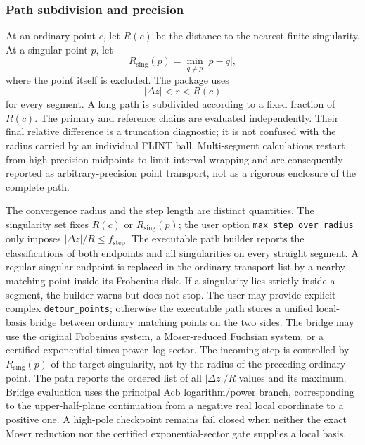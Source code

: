 \documentclass[11pt]{article}
\begin{document}
\subsubsection{Path subdivision and precision}
\label{subsec:path}

At an ordinary point $c$, let $R(c)$ be the distance to the nearest finite singularity.  At
a singular point $p$, let
\begin{equation}
 R_{\mathrm{sing}}(p)=\min_{q\ne p}|p-q|,
\end{equation}
where the point itself is excluded.  The package uses
\begin{equation}
  |\Delta z|<r< R(c)
\end{equation}
for every segment.  A long path is subdivided according to a fixed fraction of $R(c)$.  The
primary and reference chains are evaluated independently.  Their final relative difference
is a truncation diagnostic; it is not confused with the radius carried by an individual
FLINT ball.  Multi-segment calculations restart from high-precision midpoints to limit
interval wrapping and are consequently reported as arbitrary-precision point transport,
not as a rigorous enclosure of the complete path.

The convergence radius and the step length are distinct quantities.  The singularity set
fixes $R(c)$ or $R_{\mathrm{sing}}(p)$; the user option
\texttt{max\_step\_over\_radius} only imposes
$|\Delta z|/R\leq f_{\mathrm{step}}$.  The executable path builder reports the
classifications of both endpoints and all singularities on every straight segment.  A
regular singular endpoint is replaced in the ordinary transport list by a nearby matching
point inside its Frobenius disk.  If a singularity lies strictly inside a segment, the
builder warns but does not stop.  The user may provide explicit complex
\texttt{detour\_points}; otherwise the executable path stores a unified local-basis bridge
between ordinary matching points on the two sides.  The bridge may use the original
Frobenius system, a Moser-reduced Fuchsian system, or a certified exponential-times-power--log
sector.  The incoming step is controlled by
$R_{\mathrm{sing}}(p)$ of the target singularity, not by the radius of the preceding
ordinary point.  The path reports the ordered list of all $|\Delta z|/R$ values and its
maximum.  Bridge evaluation uses the principal Acb logarithm/power branch, corresponding
to the upper-half-plane continuation from a negative real local coordinate to a positive
 one.  A high-pole checkpoint remains fail closed when neither the exact Moser reduction
 nor the certified exponential-sector gate supplies a local basis.
\end{document}
